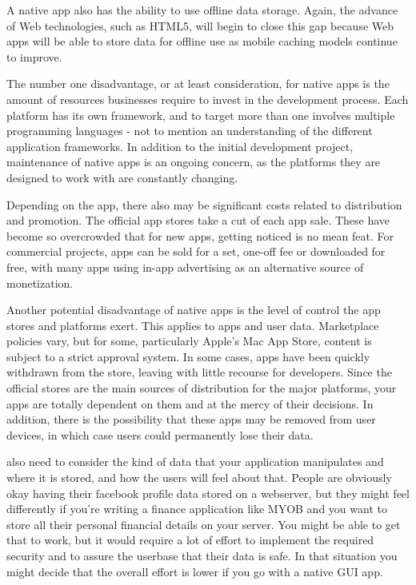 A native app also has the ability to use offline data storage. Again, the advance of Web technologies, such as HTML5, will begin to close this gap because Web apps will be able to store data for offline use as mobile caching models continue to improve.

The number one disadvantage, or at least consideration, for native apps is the amount of resources businesses require to invest in the development process. Each platform has its own framework, and to target more than one involves multiple programming languages - not to mention an understanding of the different application frameworks. In addition to the initial development project, maintenance of native apps is an ongoing concern, as the platforms they are designed to work with are constantly changing.

Depending on the app, there also may be significant costs related to distribution and promotion. The official app stores take a cut of each app sale. These have become so overcrowded that for new apps, getting noticed is no mean feat. For commercial projects, apps can be sold for a set, one-off fee or downloaded for free, with many apps using in-app advertising as an alternative source of monetization.

Another potential disadvantage of native apps is the level of control the app stores and platforms exert. This applies to apps and user data. Marketplace policies vary, but for some, particularly Apple's Mac App Store, content is subject to a strict approval system. In some cases, apps have been quickly withdrawn from the store, leaving with little recourse for developers. Since the official stores are the main sources of distribution for the major platforms, your apps are totally dependent on them and at the mercy of their decisions. In addition, there is the possibility that these apps may be removed from user devices, in which case users could permanently lose their data.

also need to consider the kind of data that your application manipulates and where it is stored, and how the users will feel about that. People are obviously okay having their facebook profile data stored on a webserver, but they might feel differently if you're writing a finance application like MYOB and you want to store all their personal financial details on your server. You might be able to get that to work, but it would require a lot of effort to implement the required security and to assure the userbase that their data is safe. In that situation you might decide that the overall effort is lower if you go with a native GUI app.

